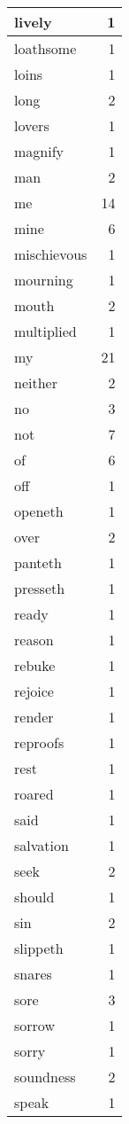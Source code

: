 \begin{center}
\begin{longtable}{l|r}
lively & 1\\ \hline 
loathsome & 1\\ \hline 
loins & 1\\ \hline 
long & 2\\ \hline 
lovers & 1\\ \hline 
magnify & 1\\ \hline 
man & 2\\ \hline 
me & 14\\ \hline 
mine & 6\\ \hline 
mischievous & 1\\ \hline 
mourning & 1\\ \hline 
mouth & 2\\ \hline 
multiplied & 1\\ \hline 
my & 21\\ \hline 
neither & 2\\ \hline 
no & 3\\ \hline 
not & 7\\ \hline 
of & 6\\ \hline 
off & 1\\ \hline 
openeth & 1\\ \hline 
over & 2\\ \hline 
panteth & 1\\ \hline 
presseth & 1\\ \hline 
ready & 1\\ \hline 
reason & 1\\ \hline 
rebuke & 1\\ \hline 
rejoice & 1\\ \hline 
render & 1\\ \hline 
reproofs & 1\\ \hline 
rest & 1\\ \hline 
roared & 1\\ \hline 
said & 1\\ \hline 
salvation & 1\\ \hline 
seek & 2\\ \hline 
should & 1\\ \hline 
sin & 2\\ \hline 
slippeth & 1\\ \hline 
snares & 1\\ \hline 
sore & 3\\ \hline 
sorrow & 1\\ \hline 
sorry & 1\\ \hline 
soundness & 2\\ \hline 
speak & 1\\ \hline 

\end{longtable}
\end{center}
